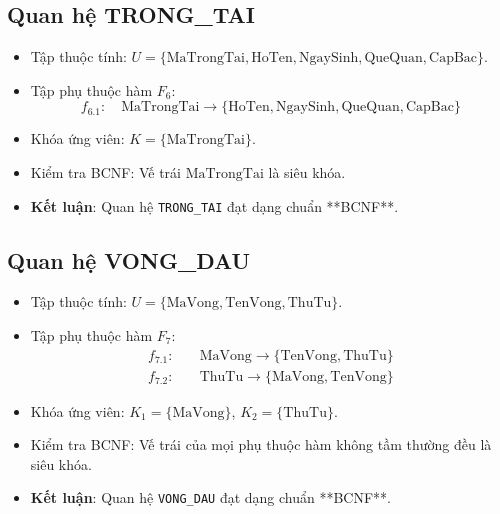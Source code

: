 \subsection{Quan hệ TRONG\_TAI}
\begin{itemize}
    \item Tập thuộc tính: $U = \{\text{MaTrongTai}, \text{HoTen}, \text{NgaySinh}, \text{QueQuan}, \text{CapBac}\}$.
    \item Tập phụ thuộc hàm $F_6$:
    $$f_{6.1}: \quad \text{MaTrongTai} \rightarrow \{\text{HoTen}, \text{NgaySinh}, \text{QueQuan}, \text{CapBac}\}$$
    \item Khóa ứng viên: $K = \{\text{MaTrongTai}\}$.
    \item Kiểm tra BCNF: Vế trái $\text{MaTrongTai}$ là siêu khóa.
    \item \textbf{Kết luận}: Quan hệ \texttt{TRONG\_TAI} đạt dạng chuẩn **BCNF**.
\end{itemize}

\subsection{Quan hệ VONG\_DAU}
\begin{itemize}
    \item Tập thuộc tính: $U = \{\text{MaVong}, \text{TenVong}, \text{ThuTu}\}$.
    \item Tập phụ thuộc hàm $F_7$:
    \begin{align*}
        f_{7.1}: & \quad \text{MaVong} \rightarrow \{\text{TenVong}, \text{ThuTu}\} \\
        f_{7.2}: & \quad \text{ThuTu} \rightarrow \{\text{MaVong}, \text{TenVong}\}
    \end{align*}
    \item Khóa ứng viên: $K_1 = \{\text{MaVong}\}$, $K_2 = \{\text{ThuTu}\}$.
    \item Kiểm tra BCNF: Vế trái của mọi phụ thuộc hàm không tầm thường đều là siêu khóa.
    \item \textbf{Kết luận}: Quan hệ \texttt{VONG\_DAU} đạt dạng chuẩn **BCNF**.
\end{itemize}

